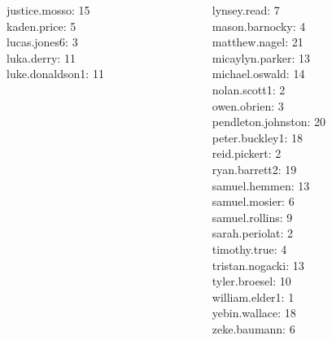 \documentclass[10pt]{beamer}
\begin{document}
\begin{frame}
\begin{columns}
\begin{column}{0.33\textwidth}
justice.mosso: 15 \\ 
kaden.price: 5 \\ 
lucas.jones6: 3 \\ 
luka.derry: 11 \\ 
luke.donaldson1: 11 \\\end{column}
\begin{column}{0.33\textwidth}
lynsey.read: 7 \\ 
mason.barnocky: 4 \\ 
matthew.nagel: 21 \\ 
micaylyn.parker: 13 \\ 
michael.oswald: 14 \\ 
nolan.scott1: 2 \\ 
owen.obrien: 3 \\ 
pendleton.johnston: 20 \\ 
peter.buckley1: 18 \\ 
reid.pickert: 2 \\ 
ryan.barrett2: 19 \\ 
samuel.hemmen: 13 \\ 
samuel.mosier: 6 \\ 
samuel.rollins: 9 \\ 
sarah.periolat: 2 \\ 
timothy.true: 4 \\ 
tristan.nogacki: 13 \\ 
tyler.broesel: 10 \\ 
william.elder1: 1 \\ 
yebin.wallace: 18 \\ 
zeke.baumann: 6 \\\end{column}
\end{columns}
\vfill
\end{frame}
\end{document}
